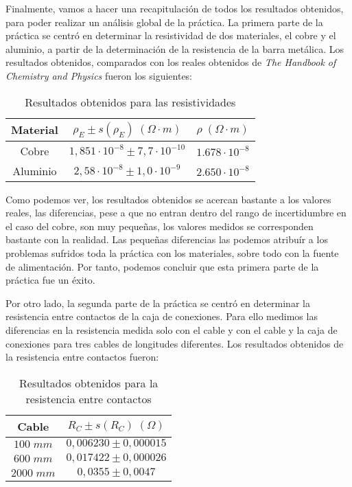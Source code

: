 \documentclass[a4paper,12pt,titlepage]{article}
\begin{document}
Finalmente, vamos a hacer una recapitulación de todos los resultados obtenidos, para poder realizar un análisis global de la práctica. La primera parte de la práctica se centró en determinar la resistividad de dos materiales, el cobre y el aluminio, a partir de la determinación de la resistencia de la barra metálica. Los resultados obtenidos, comparados con los reales obtenidos de \textit{The Handbook of Chemistry and Physics} fueron los siguientes:

\begin{table}[h!]
    \centering
    \begin{tabular}{|c|c|c|}
        \hline
        Material & $\rho_E \pm s(\rho_E) \; (\Omega \cdot m)$ & $\rho \; (\Omega \cdot m)$  \\ \hline
        Cobre  & $1,851 \cdot 10^{-8} \pm 7,7 \cdot 10^{-10}$ & $1.678 \cdot 10^{-8}$ \\ \hline
        Aluminio &$2,58 \cdot 10^{-8} \pm 1,0 \cdot 10^{-9}$ & $2.650\cdot 10^{-8}$\\ \hline
    \end{tabular}
    \caption{Resultados obtenidos para las resistividades}
\end{table}

Como podemos ver, los resultados obtenidos se acercan bastante a los valores reales, las diferencias, pese a que no entran dentro del rango de incertidumbre en el caso del cobre, son muy pequeñas, los valores medidos se corresponden bastante con la realidad. Las pequeñas diferencias las podemos atribuír a los problemas sufridos toda la práctica con los materiales, sobre todo con la fuente de alimentación. Por tanto, podemos concluir que esta primera parte de la práctica fue un éxito.

\par Por otro lado, la segunda parte de la práctica se centró en determinar la resistencia entre contactos de la caja de conexiones. Para ello medimos las diferencias en la resistencia medida solo con el cable y con el cable y la caja de conexiones para tres cables de longitudes diferentes. Los resultados obtenidos de la resistencia entre contactos fueron:

\begin{table}[h!]
    \centering
    \begin{tabular}{|c|c|}
        \hline
        Cable & $R_{C} \pm s(R_C) \; (\Omega)$ \\ \hline
        $100 \; mm$ & $0,006230 \pm 0,000015$\\ \hline
        $600 \; mm$ & $0,017422 \pm 0,000026$\\ \hline
        $2000 \; mm$ & $0,0355 \pm 0,0047$\\ \hline
    \end{tabular}
    \caption{Resultados obtenidos para la resistencia entre contactos}
\end{table}
\end{document}
